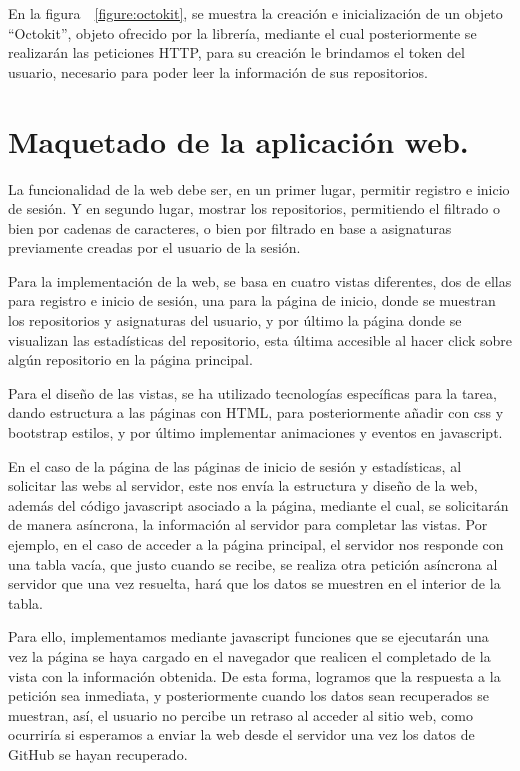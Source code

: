 En la figura~~\ref{figure:octokit}, se muestra la creación e inicialización de un objeto “Octokit”, objeto ofrecido por la librería, mediante el cual posteriormente se realizarán las peticiones HTTP, para su creación le brindamos el token del usuario, necesario para poder leer la información de sus repositorios. 



\section{Maquetado de la aplicación web.}

La funcionalidad de la web debe ser, en un primer lugar, permitir registro e inicio de sesión. Y en segundo lugar, mostrar los repositorios, permitiendo el filtrado o bien por cadenas de caracteres, o bien por filtrado en base a asignaturas previamente creadas por el usuario de la sesión.

Para la implementación de la web, se basa en cuatro vistas diferentes, dos de ellas para registro e inicio de sesión, una para la página de inicio, donde se muestran los repositorios y asignaturas del usuario, y por último la página donde se visualizan las estadísticas del repositorio, esta última accesible al hacer click sobre algún repositorio en la página principal.

Para el diseño de las vistas, se ha utilizado tecnologías específicas para la tarea, dando estructura a las páginas con HTML, para posteriormente añadir con css y bootstrap estilos, y por último implementar animaciones y eventos en javascript.

En el caso de la página de las páginas de inicio de sesión y estadísticas, al solicitar las webs al servidor, este nos envía la estructura y diseño de la web, además del código javascript asociado a la página,  mediante el cual, se solicitarán de manera asíncrona, la información al servidor para completar las vistas. Por ejemplo, en el caso de acceder a la página principal, el servidor nos responde con una tabla vacía, que justo cuando se recibe, se realiza otra petición asíncrona al servidor que una vez resuelta, hará que los datos se muestren en el interior de la tabla. 

Para ello, implementamos mediante javascript funciones que se ejecutarán una vez la página se haya cargado en el navegador que realicen el completado de la vista con la información obtenida. De esta forma, logramos que la respuesta a la petición sea inmediata, y posteriormente cuando los datos sean recuperados se muestran, así, el usuario no percibe un retraso al acceder al sitio web, como ocurriría si esperamos a enviar la web desde el servidor una vez los datos de GitHub se hayan recuperado.


